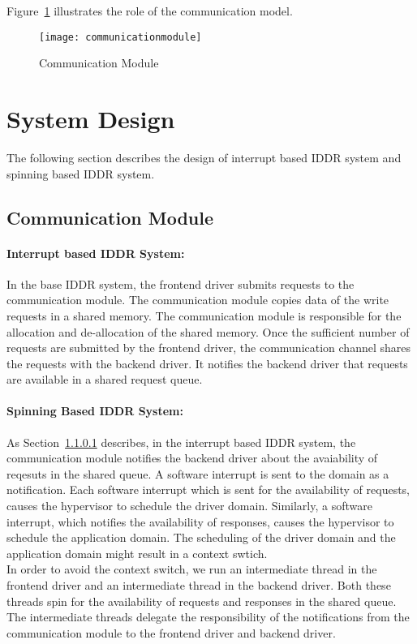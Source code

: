 Figure~\ref{fig:communication} illustrates the role of the communication model. 
\begin{figure}[!ht]
\centering
\texttt{[image: communicationmodule]}
\caption{Communication Module}
\label{fig:communication}
\end{figure}

\section{System Design}\label{design}

The following section describes the design of interrupt based IDDR system and spinning based IDDR system. 

\subsection{Communication Module}

\paragraph{Interrupt based IDDR System:}
\label{par:base IDDR communication}
In the base IDDR system, the frontend driver submits requests to the communication module. The communication module copies data of the write requests in a shared memory. The communication module is responsible for the allocation and de-allocation of the shared memory. Once the sufficient number of requests are submitted by the frontend driver, the communication channel shares the requests with the backend driver. It notifies the backend driver that requests are available in a shared request queue.

\paragraph{Spinning Based IDDR System:}
\label{par:spin IDDR communication}
As Section~\ref{par:base IDDR communication} describes, in the interrupt based IDDR system, the communication module notifies the backend driver about the avaiability of reqesuts in the shared queue. A software interrupt is sent to the domain as a notification. Each software interrupt which is sent for the availability of requests, causes the hypervisor to schedule the driver domain. Similarly, a software interrupt, which notifies the availability of responses, causes the hypervisor to schedule the application domain. The scheduling of the driver domain and the application domain might result in a context swtich. 
\\[3mm]
In order to avoid the context switch, we run an intermediate thread in the frontend driver and an intermediate thread in the backend driver. Both these threads spin for the availability of requests and responses in the shared queue. The intermediate threads delegate the responsibility of the notifications from the communication module to the frontend driver and backend driver. 

